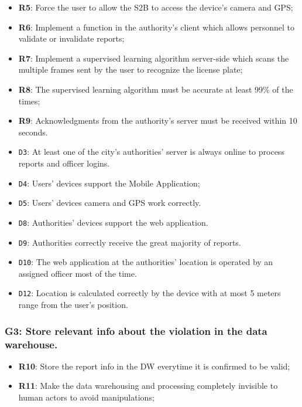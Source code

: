 \documentclass[12pt,a4paper]{article}
\begin{document}
	\begin{itemize}
			\item \textbf{R5}: Force the user to allow the S2B to access the device's camera and GPS;
			\item \textbf{R6}: Implement a function in the authority's client which allows personnel to validate or invalidate reports;
			\item \textbf{R7}: Implement a supervised learning algorithm server-side which scans the multiple frames sent by the user to recognize the license plate;
			\item \textbf{R8}: The supervised learning algorithm must be accurate at least 99\% of the times;
			\item \textbf{R9}: Acknowledgments from the authority's server must be received within 10 seconds.
	\end{itemize}
	
	\begin{itemize}
			\item \texttt{D3}: At least one of the city's authorities' server is always online to process reports and officer logins.
			\item \texttt{D4}: Users' devices support the Mobile Application;
			\item \texttt{D5}: Users' devices camera and GPS work correctly.
			\item \texttt{D8}: Authorities' devices support the web application.
			\item \texttt{D9}: Authorities correctly receive the great majority of reports.
			\item \texttt{D10}: The web application at the authorities' location is operated by an assigned officer most of the time.
			\item \texttt{D12}: Location is calculated correctly by the device with at most 5 meters range from the user's position.
	\end{itemize}

\subsubsection{G3: Store relevant info about the violation in the data warehouse.}
	
	\begin{itemize}
			\item \textbf{R10}: Store the report info in the DW everytime it is confirmed to be valid;
			\item \textbf{R11}: Make the data warehousing  and processing completely invisible to human actors to avoid manipulations;
	\end{itemize}
	
\end{document}

